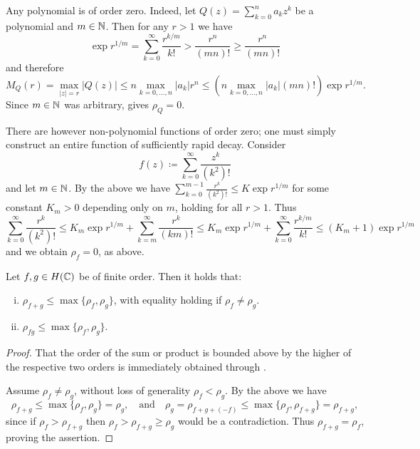 \begin{remark} \label{rem:order-zero}
    Any polynomial is of order zero. Indeed, let $Q(z) = \sum_{k=0}^n a_k z^k$ be a polynomial and $m \in \mathbb{N}$. Then for any $r > 1$ we have
    $$ \exp r^{1/m} = \sum_{k=0}^\infty \frac{r^{k/m}}{k!} > \frac{r^{n}}{(mn)!} \geq \frac{r^{n}}{(mn)!} $$
    and therefore
    $$ M_Q(r) = \max_{\vert z \vert = r} \vert Q(z) \vert \leq n \max_{k = 0, \hdots, n} \vert a_k \vert r^n \leq \left( n \max_{k = 0, \hdots, n} \vert a_k \vert (mn)! \right) \exp r^{1/m}. $$
    Since $m \in \mathbb{N}$ was arbitrary,  gives $\rho_Q = 0$.

    There are however non-polynomial functions of order zero; one must simply construct an entire function of sufficiently rapid decay. Consider
    $$ f(z) \coloneqq \sum_{k=0}^\infty \frac{z^k}{(k^2)!} $$
    and let $m \in \mathbb{N}$. By the above we have $\sum_{k=0}^{m-1} \frac{r^k}{(k^2)!} \leq K \exp r^{1/m}$ for some constant $K_m > 0$ depending only on $m$, holding for all $r > 1$. Thus
    $$ \sum_{k=0}^\infty \frac{r^k}{(k^2)!} \leq K_m \exp r^{1/m} + \sum_{k=m}^\infty \frac{r^k}{(km)!} \leq K_m \exp r^{1/m} + \sum_{k=0}^\infty \frac{r^{k/m}}{k!} \leq (K_m + 1) \exp r^{1/m} $$
    and we obtain $\rho_f = 0$, as above.
\end{remark}

\begin{proposition} \label{prop:order-sum-product-estimate}
    Let $f, g \in H(\mathbb{C})$ be of finite order. Then it holds that:
    \begin{enumerate}[i.]
        \item $\rho_{f + g} \leq \max \{ \rho_f, \rho_g \}$, with equality holding if $\rho_f \neq \rho_g$.
        \item $\rho_{fg} \leq \max \{ \rho_f, \rho_g \}$.
    \end{enumerate}
\end{proposition}

\begin{proof}
    That the order of the sum or product is bounded above by the higher of the respective two orders is immediately obtained through .

    Assume $\rho_f \neq \rho_g$, without loss of generality $\rho_f < \rho_g$. By the above we have
    \begin{equation*}
        \rho_{f+g} \leq \max \{ \rho_f, \rho_g \} = \rho_g, \quad\textrm{and}\quad \rho_g = \rho_{f+g+(-f)} \leq \max \{ \rho_f, \rho_{f+g} \} = \rho_{f+g},
    \end{equation*}
    since if $\rho_f > \rho_{f+g}$ then $\rho_f > \rho_{f+g} \geq \rho_g$ would be a contradiction. Thus $\rho_{f+g} = \rho_f$, proving the assertion.
\end{proof}

